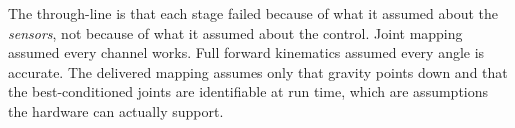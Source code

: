 The through-line is that each stage failed because of what it assumed about
the \emph{sensors}, not because of what it assumed about the control. Joint
mapping assumed every channel works. Full forward kinematics assumed every
angle is accurate. The delivered mapping assumes only that gravity points down
and that the best-conditioned joints are identifiable at run time, which are
assumptions the hardware can actually support.
